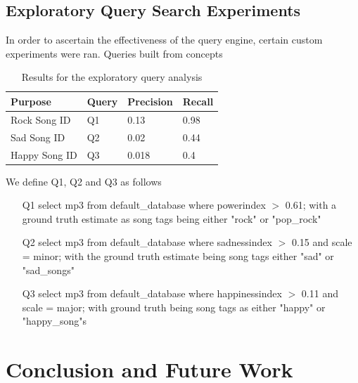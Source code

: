 \documentclass{article}
\begin{document}
\subsection{Exploratory Query Search Experiments}

In order to ascertain the effectiveness of the query engine, certain custom experiments were ran. Queries built from concepts 

\begin{table}[!htb]
\begin{center}
    \begin{tabular}{| l | l | l | l |}
    \hline
    Purpose &  Query & Precision  & Recall \\ \hline
    Rock Song ID &  Q1 & 0.13  & 0.98 \\ \hline
    Sad Song ID &  Q2 & 0.02  & 0.44 \\ \hline
    Happy Song ID &  Q3 & 0.018  & 0.4 \\
    \hline
    \end{tabular}
\end{center}
\caption{Results for the exploratory query analysis}
\end{table}

\newpage

\noindent We define Q1, Q2 and Q3 as follows

\begin{enumerate}
\item [Q1] select mp3 from default\_database where powerindex $>$ 0.61; with a ground truth estimate as song tags being either "rock" or "pop\_rock"
\item [Q2] select mp3 from default\_database where sadnessindex $>$ 0.15 and scale = minor; with the ground truth estimate being song tags either "sad" or "sad\_songs" 
\item [Q3] select mp3 from default\_database where happinessindex $>$ 0.11 and scale = major; with ground truth being song tags as either "happy" or "happy\_song"s
\end{enumerate}





\section{Conclusion and Future Work}



\end{document}

